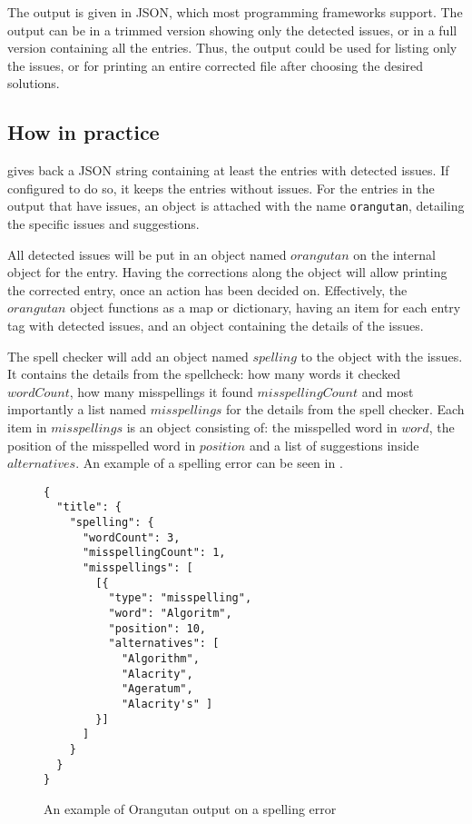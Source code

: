 The output is given in JSON, which most programming frameworks
support.  The output can be in a trimmed version showing only the
detected issues, or in a full version containing all the entries.
Thus, the output could be used for listing only the issues, or for
printing an entire corrected {\bibtex} file after choosing the desired
solutions.


\subsection{How in practice}
\label{sec:organizing_orangutan_how_practice}

{\orangutan} gives back a JSON string containing at least the entries
with detected issues.  If configured to do so, it keeps the entries
without issues.  For the entries in the output that have issues, an
object is attached with the name \texttt{orangutan}, detailing the
specific issues and suggestions.

All detected issues will be put in an object named $orangutan$ on the
internal object for the entry.  Having the corrections along the
object will allow printing the corrected entry, once an action has
been decided on.  Effectively, the $orangutan$ object functions as a
map or dictionary, having an item for each entry tag with detected
issues, and an object containing the details of the issues.

The spell checker will add an object named $spelling$ to the object
with the issues.  It contains the details from the spellcheck: how
many words it checked $wordCount$, how many misspellings it found
$misspellingCount$ and most importantly a list named $misspellings$
for the details from the spell checker.  Each item in $misspellings$
is an object consisting of: the misspelled word in $word$, the
position of the misspelled word in $position$ and a list of
suggestions inside $alternatives$.  An example of a spelling error can
be seen in .

\begin{figure}
  \centering
\begin{verbatim}
{
  "title": {
    "spelling": {
      "wordCount": 3,
      "misspellingCount": 1,
      "misspellings": [
        [{
          "type": "misspelling",
          "word": "Algoritm",
          "position": 10,
          "alternatives": [
            "Algorithm",
            "Alacrity",
            "Ageratum",
            "Alacrity's" ]
        }]
      ]
    }
  }
}
\end{verbatim}
\caption{An example of Orangutan output on a spelling error}
\label{fig:orgazing_misspelling_output}
\end{figure}

